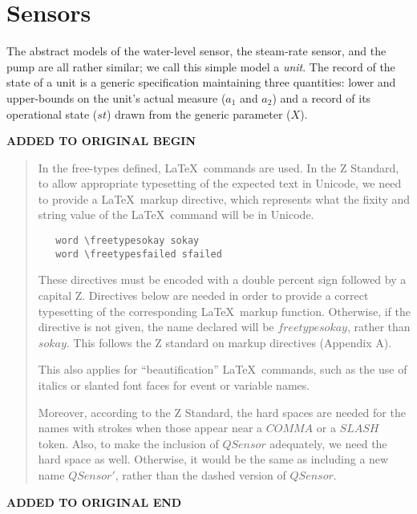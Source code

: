 \documentclass{report}
\renewcommand{\freetype}[1]{\mathsf{#1}}
\newcommand{\freetypesfailed}{\freetype{sfailed}}
\newcommand{\freetypesokay}{\freetype{sokay}}
\newenvironment{addedstuff}{\begin{flushleft}\textbf{ADDED TO ORIGINAL BEGIN}\begin{quote}\begin{minipage}{.8\textwidth}}{\end{minipage}\end{quote}\textbf{ADDED TO ORIGINAL END}\end{flushleft}}
\begin{document}
\section{Sensors}

The abstract models of the water-level sensor, the steam-rate sensor,
and the pump are all rather similar; we call this simple model a
\emph{unit}.  The record of the state of a unit is a generic
specification maintaining three quantities: lower and upper-bounds on
the unit's actual measure (\( a_1 \) and \( a_2 \)) and a record of
its operational state (\( st \)) drawn from the generic parameter (\(
X \)).

\begin{addedstuff}
In the free-types defined, \LaTeX\ commands are used. In the Z Standard,
to allow appropriate typesetting of the expected text in Unicode, we need
to provide a \LaTeX\ markup directive, which represents what the fixity
and string value of the \LaTeX\ command will be in Unicode.
%
\begin{verbatim}
   word \freetypesokay sokay
   word \freetypesfailed sfailed
\end{verbatim}
%
These directives must be encoded with a double percent sign followed by
a capital Z. Directives below are needed in order to provide a correct
typesetting of the corresponding \LaTeX\ markup function.
Otherwise, if the directive is not given, the name declared will be $freetypesokay$, rather than $sokay$. This follows
the Z standard on markup directives (Appendix A).

This also applies for ``beautification'' \LaTeX\ commands, such as
the use of italics or slanted font faces for event or variable names.

Moreover, according to the Z Standard, the hard spaces are needed for the names
with strokes when those appear near a $COMMA$ or a $SLASH$ token. Also,
to make the inclusion of $QSensor$ adequately, we need the hard space as well.
Otherwise, it would be the same as including a new name $QSensor'$, rather than
the dashed version of $QSensor$.
\end{addedstuff}
\end{document}
